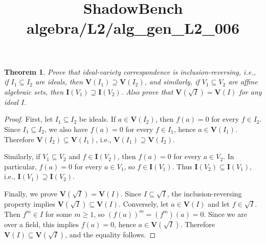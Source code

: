 \documentclass{article}
\title{ShadowBench algebra/L2/alg\_gen\_L2\_006}
\newtheorem{theorem}{Theorem}
\begin{document}
\maketitle

\begin{theorem}
Prove that ideal-variety correspondence is inclusion-reversing, i.e., 
if $I_1 \subseteq I_2$ are ideals, then $\mathbf V(I_1) \supseteq \mathbf V(I_2)$, 
and similarly, if $V_1 \subseteq V_2$ are affine algebraic sets, then $\mathbf I(V_1) \supseteq \mathbf I(V_2)$. 
Also prove that $\mathbf V(\sqrt{I})=\mathbf V(I)$ for any ideal $I$.
\end{theorem}

\begin{proof}
First, let $I_1 \subseteq I_2$ be ideals. If $a \in \mathbf V(I_2)$, then $f(a)=0$ for every $f \in I_2$.
Since $I_1 \subseteq I_2$, we also have $f(a)=0$ for every $f \in I_1$, hence $a \in \mathbf V(I_1)$.
Therefore $\mathbf V(I_2) \subseteq \mathbf V(I_1)$, i.e., $\mathbf V(I_1) \supseteq \mathbf V(I_2)$.

Similarly, if $V_1 \subseteq V_2$ and $f \in \mathbf I(V_2)$, then $f(a)=0$ for every $a \in V_2$.
In particular, $f(a)=0$ for every $a \in V_1$, so $f \in \mathbf I(V_1)$.
Thus $\mathbf I(V_2) \subseteq \mathbf I(V_1)$, i.e., $\mathbf I(V_1) \supseteq \mathbf I(V_2)$.

Finally, we prove $\mathbf V(\sqrt{I})=\mathbf V(I)$.
Since $I \subseteq \sqrt{I}$, the inclusion-reversing property implies $\mathbf V(\sqrt{I}) \subseteq \mathbf V(I)$.
Conversely, let $a \in \mathbf V(I)$ and let $f \in \sqrt{I}$. Then $f^m \in I$ for some $m \ge 1$,
so $(f(a))^m = (f^m)(a) = 0$. Since we are over a field, this implies $f(a)=0$, hence $a \in \mathbf V(\sqrt{I})$.
Therefore $\mathbf V(I) \subseteq \mathbf V(\sqrt{I})$, and the equality follows.
\end{proof}
\end{document}
